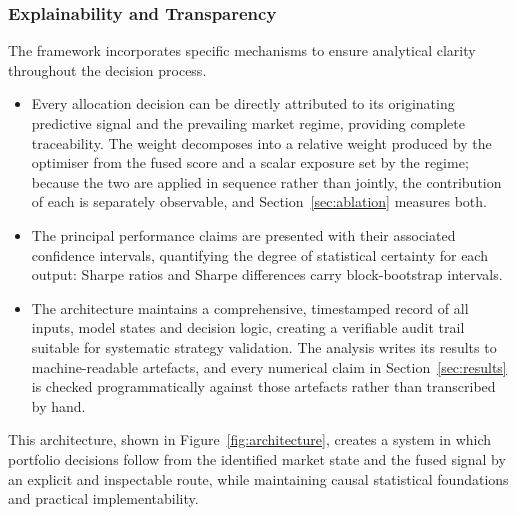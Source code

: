 \subsubsection{Explainability and Transparency}

The framework incorporates specific mechanisms to ensure analytical clarity throughout
the decision process.

\begin{itemize}
\item Every allocation decision can be directly attributed to its originating predictive
signal and the prevailing market regime, providing complete traceability. The weight
decomposes into a relative weight produced by the optimiser from the fused score and a
scalar exposure set by the regime; because the two are applied in sequence rather than
jointly, the contribution of each is separately observable, and
Section~\ref{sec:ablation} measures both.
\item The principal performance claims are presented with their associated confidence
intervals, quantifying the degree of statistical certainty for each output: Sharpe ratios
and Sharpe differences carry block-bootstrap intervals.
\item The architecture maintains a comprehensive, timestamped record of all inputs, model
states and decision logic, creating a verifiable audit trail suitable for systematic
strategy validation. The analysis writes its results to machine-readable artefacts, and
every numerical claim in Section~\ref{sec:results} is checked programmatically against
those artefacts rather than transcribed by hand.
\end{itemize}

This architecture, shown in Figure~\ref{fig:architecture}, creates a system in which
portfolio decisions follow from the identified market state and the fused signal by an
explicit and inspectable route, while maintaining causal statistical foundations and
practical implementability.

